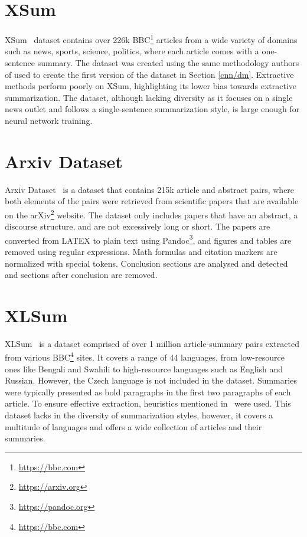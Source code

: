 \documentclass[english, ba, kiv, he, iso690numb, pdf, viewonly]{fasthesis}
\begin{document}
\section{XSum} \label{sec:xsum}
XSum~\cite{xsum-emnlp} dataset contains over 226k BBC\footnote{\url{https://bbc.com}} articles from a wide variety of domains such as news, sports, science, politics, where each article comes with a one-sentence summary. The dataset was created using the same methodology authors of \cite{HermannKGEKSB15} used to create the first version of the dataset in Section \ref{cnn/dm}. Extractive methods perform poorly on XSum, highlighting its lower bias towards extractive summarization. The dataset, although lacking diversity as it focuses on a single news outlet and follows a single-sentence summarization style, is large enough for neural network training.

\section{Arxiv Dataset}
Arxiv Dataset~\cite{cohan2018discourseaware} is a dataset that contains 215k article and abstract pairs, where both elements of the pairs were retrieved from scientific papers that are available on the arXiv\footnote{\url{https://arxiv.org}} website. The dataset only includes papers that have an abstract, a discourse structure, and are not excessively long or short. The papers are converted from LATEX to plain text using Pandoc\footnote{\url{https://pandoc.org}}, and figures and tables are removed using regular expressions. Math formulas and citation markers are normalized with special tokens. Conclusion sections are analysed and detected and sections after conclusion are removed.

\section{XLSum} \label{xlsum}
XLSum~\cite{hasan-etal-2021-xl} is a dataset comprised of over 1 million article-summary pairs extracted from various BBC\footnote{\url{https://bbc.com}} sites. It covers a range of 44 languages, from low-resource ones like Bengali and Swahili to high-resource languages such as English and Russian. However, the Czech language is not included in the dataset. Summaries were typically presented as bold paragraphs in the first two paragraphs of each article. To ensure effective extraction, heuristics mentioned in~\cite{hasan-etal-2021-xl} were used. This dataset lacks in the diversity of summarization styles, however, it covers a multitude of languages and offers a wide collection of articles and their summaries.
\end{document}
